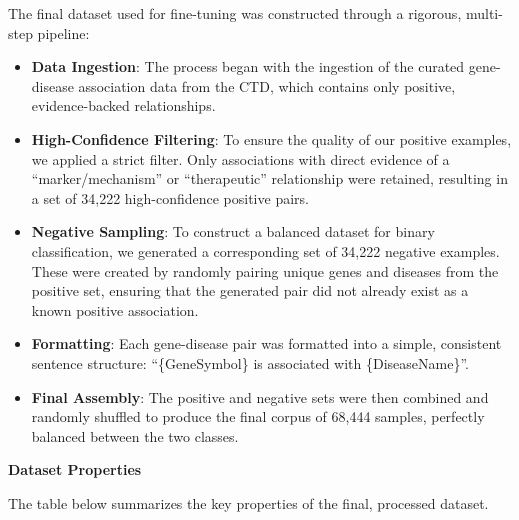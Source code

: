 \documentclass{article}
\begin{document}
The final dataset used for fine-tuning was constructed through a rigorous, multi-step pipeline:
\begin{itemize}
    \item \textbf{Data Ingestion}: The process began with the ingestion of the curated gene-disease association data from the CTD, which contains only positive, evidence-backed relationships.
    \item \textbf{High-Confidence Filtering}: To ensure the quality of our positive examples, we applied a strict filter. Only associations with direct evidence of a ``marker/mechanism'' or ``therapeutic'' relationship were retained, resulting in a set of 34,222 high-confidence positive pairs.
    \item \textbf{Negative Sampling}: To construct a balanced dataset for binary classification, we generated a corresponding set of 34,222 negative examples. These were created by randomly pairing unique genes and diseases from the positive set, ensuring that the generated pair did not already exist as a known positive association.
    \item \textbf{Formatting}: Each gene-disease pair was formatted into a simple, consistent sentence structure: ``\{GeneSymbol\} is associated with \{DiseaseName\}''.
    \item \textbf{Final Assembly}: The positive and negative sets were then combined and randomly shuffled to produce the final corpus of 68,444 samples, perfectly balanced between the two classes.
\end{itemize}

\textbf{Dataset Properties}

The table below summarizes the key properties of the final, processed dataset.
\end{document}
